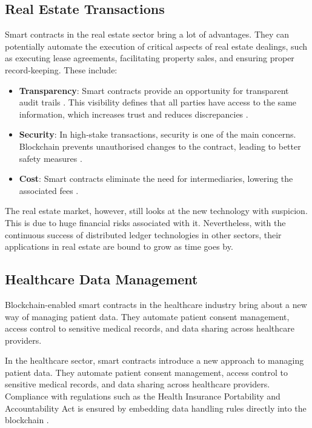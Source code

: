 \subsection{Real Estate Transactions}

Smart contracts in the real estate sector bring a lot of advantages. They can potentially automate the execution of critical aspects of real estate dealings, such as executing lease agreements, facilitating property sales, and ensuring proper record-keeping. These include:

\begin{itemize}
    \item \textbf{Transparency}: Smart contracts provide an opportunity for transparent audit trails \cite{LaarabiEtAl2022}. This visibility defines that all parties have access to the same information, which increases trust and reduces discrepancies \cite{MohantaEtAl2018}.
    \item \textbf{Security}: In high-stake transactions, security is one of the main concerns. Blockchain prevents unauthorised changes to the contract, leading to better safety measures \cite{UllahEtAl2023, LaarabiEtAl2022}.
    \item \textbf{Cost}: Smart contracts eliminate the need for intermediaries, lowering the associated fees \cite{UzairEtAl2018, MohantaEtAl2018}.
\end{itemize}

The real estate market, however, still looks at the new technology with suspicion. This is due to huge financial risks associated with it. Nevertheless, with the continuous success of distributed ledger technologies in other sectors, their applications in real estate are bound to grow as time goes by.

\subsection{Healthcare Data Management}

Blockchain-enabled smart contracts in the healthcare industry bring about a new way of managing patient data. They automate patient consent management, access control to sensitive medical records, and data sharing across healthcare providers.

In the healthcare sector, smart contracts introduce a new approach to managing patient data. They automate patient consent management, access control to sensitive medical records, and data sharing across healthcare providers. Compliance with regulations such as the Health Insurance Portability and Accountability Act is ensured by embedding data handling rules directly into the blockchain \cite{Khatoon2020}.

